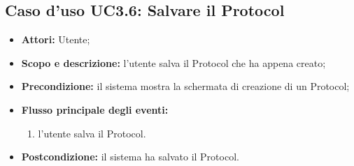 \subsection{Caso d'uso UC3.6: Salvare il Protocol}
\begin{itemize}
\item \textbf{Attori:} Utente;
\item \textbf{Scopo e descrizione:} l'utente salva il Protocol\glossario{} che ha appena creato;
\item \textbf{Precondizione:} il sistema mostra la schermata di creazione di un Protocol\glossario{};
\item \textbf{Flusso principale degli eventi:}
\begin{enumerate}
\item l'utente salva il Protocol\glossario{}.
\end{enumerate}
\item \textbf{Postcondizione:} il sistema ha salvato il Protocol\glossario{}.
\end{itemize}


